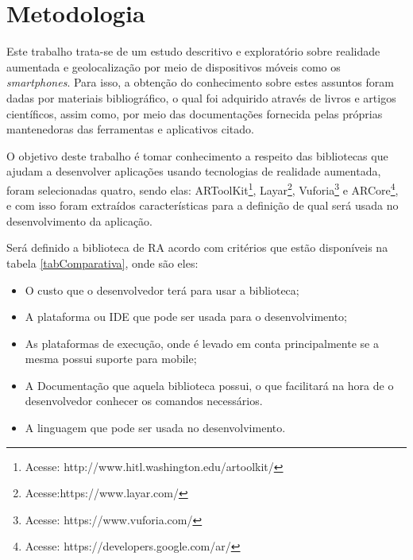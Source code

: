 \chapter{Metodologia}\label{cap:metodologia}

Este trabalho trata-se de um estudo descritivo e exploratório sobre realidade aumentada e geolocalização por meio de dispositivos móveis como os \textit{smartphones}. Para isso, a obtenção do conhecimento sobre estes assuntos foram dadas por materiais bibliográfico, o qual foi adquirido através de livros e artigos científicos, assim como, por meio das documentações fornecida pelas próprias mantenedoras das ferramentas e aplicativos citado.

O objetivo deste trabalho é tomar conhecimento a respeito das bibliotecas que ajudam a desenvolver aplicações usando tecnologias de realidade aumentada, foram selecionadas quatro, sendo elas: ARToolKit\footnote{Acesse: http://www.hitl.washington.edu/artoolkit/}, Layar\footnote{Acesse:https://www.layar.com/}, Vuforia\footnote{Acesse: https://www.vuforia.com/} e ARCore\footnote{Acesse: https://developers.google.com/ar/}, e com isso foram extraídos características para a definição de qual será usada no desenvolvimento da aplicação.

Será definido a biblioteca de RA acordo com critérios que estão disponíveis na tabela \ref{tabComparativa}, onde são eles:

\begin{itemize}
	\item O custo que o desenvolvedor terá para usar a biblioteca;
	\item A plataforma ou IDE que pode ser usada para o desenvolvimento;
	\item As plataformas de execução, onde é levado em conta principalmente se a mesma possui suporte para mobile;
	\item A Documentação que aquela biblioteca possui, o que facilitará na hora de o desenvolvedor conhecer os comandos necessários.
	\item A linguagem que pode ser usada no desenvolvimento.
\end{itemize}
